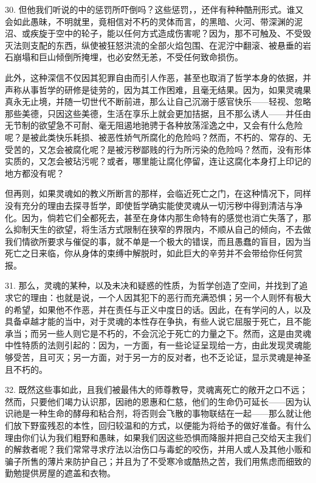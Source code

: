 30. 但他我们听说的中的惩罚所吓倒吗？这些惩罚，，还伴有种种酷刑形式。谁又会如此愚昧，不明就里，竟相信对不朽的灵体而言，的黑暗、火河、带深渊的泥沼、或疾旋于空中的轮子，能以任何方式造成伤害呢？因为，那不可触及、不受毁灭法则支配的东西，纵使被狂怒洪流的全部火焰包围、在泥泞中翻滚、被悬垂的岩石崩塌和巨山倾倒所掩埋，也必安然无恙，不受任何致命损伤。\par

此外，这种深信不仅因其犯罪自由而引人作恶，甚至也取消了哲学本身的依据，并声称从事哲学的研修是徒劳的，因为其工作困难，且毫无结果。因为，如果灵魂果真永无止境，并随一切世代不断前进，那么让自己沉溺于感官快乐——轻视、忽略那些美德，只因这些美德，生活在享乐上就会更加拮据，且不那么诱人——并任由无节制的欲望急不可耐、毫无阻遏地驰骋于各种放荡淫逸之中，又会有什么危险呢？是被此类快乐耗损、被恶性娇气所腐化的危险吗？然而，不朽的、常存的、无受苦的，又怎会被腐化呢？是被污秽鄙贱的行为所污染的危险吗？然而，没有形体实质的，又怎会被玷污呢？或者，哪里能让腐化停留，连让这腐化本身打上印记的地方都没有呢？\par

但再则，如果灵魂如的教义所断言的那样，会临近死亡之门，在这种情况下，同样没有充分的理由去探寻哲学，即使哲学确实能使灵魂从一切污秽中得到清洁与净化。因为，倘若它们全都死去，甚至在身体内那生命特有的感觉也消亡失落了，那么抑制天生的欲望，将生活方式限制在狭窄的界限内，不顺从自己的倾向，不去做我们情欲所要求与催促的事，就不单是一个极大的错误，而且愚蠢的盲目，因为当死亡之日来临，你从身体的束缚中解脱时，如此巨大的辛劳并不会带给你任何赏报。\par

31. 那么，灵魂的某种，以及未决和疑惑的性质，为哲学创造了空间，并找到了追求它的理由：也就是说，一个人因其犯下的恶行而充满恐惧；另一个人则怀有极大的希望，如果他不作恶，并在责任与正义中度日的话。因此，在有学问的人，以及具备卓越才能的当中，对于灵魂的本性存在争执，有些人说它屈服于死亡，且不能承当；而另一些人则它是不朽的，不会沉沦于死亡的力量之下。然而，这是由灵魂中性特质的法则引起的：因为，一方面，有一些论证呈现给一方，由此发现灵魂能够受苦，且可灭；另一方面，对于另一方的反对者，也不乏论证，显示灵魂是神圣且不朽的。\par

32. 既然这些事如此，且我们被最伟大的师尊教导，灵魂离死亡的敞开之口不远；然而，只要他们竭力认识那，因祂的恩惠和仁慈，他们的生命仍可延长——因为认识祂是一种生命的酵母和粘合剂，将否则会飞散的事物联结在一起——那么就让他们放下野蛮残忍的本性，回归较温和的方式，以便能为将给予的做好准备。有什么理由你们认为我们粗野和愚昧，如果我们因这些恐惧而降服并把自己交给天主我们的解救者呢？我们常常寻求疗法以治伤口与毒蛇的咬伤，并用人或人及其他小贩和骗子所售的薄片来防护自己；并且为了不受寒冷或酷热之苦，我们用焦虑而细致的勤勉提供房屋的遮盖和衣物。\par

